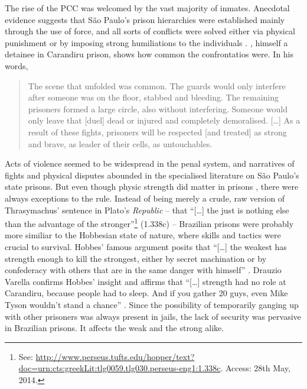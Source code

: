 The rise of the PCC was welcomed by the vast majority of inmates. Anecdotal evidence suggests that S\~{a}o Paulo's prison hierarchies were established mainly through the use of force, and all sorts of conflicts were solved either via physical punishment or by imposing strong humiliations to the individuals \citep[]{adorno1991sistema, ramalho1979mundo}. \citet[4]{negrini2002enjaulado}, himself a detainee in Carandiru prison, shows how common the confrontatios were. In his words,

\begin{quotation}
The scene that unfolded was common. The guards would only interfere after someone was on the floor, stabbed and bleeding. The remaining prisoners formed a large circle, also without interfering. Someone would only leave that [duel] dead or injured and completely demoralised. [\dots] As a result of these fights, prisoners will be respected [and treated] as strong and brave, as leader of their cells, as untouchables. 
\end{quotation}

Acts of violence seemed to be widespread in the penal system, and narratives of fights and physical disputes abounded in the specialised literature on S\~{a}o Paulo's state prisons. But even though physic strength did matter in prisons \citep[]{thompson1980questao, ramalho1979mundo}, there were always exceptions to the rule. Instead of being merely a crude, raw version of Thrasymachus' sentence in Plato's \textit{Republic} -- that ``[\dots] the just is nothing else than the advantage of the stronger''\footnote{See: \href{http://www.perseus.tufts.edu/hopper/text?doc=urn:cts:greekLit:tlg0059.tlg030.perseus-eng1:1.338c}{http://www.perseus.tufts.edu/hopper/text?doc=urn:cts:greekLit:tlg0059.tlg030.perseus-eng1:1.338c}. Access: 28th May, 2014.} (1.338c) -- Brazilian prisons were probably more similiar to the Hobbesian state of nature, where skills and tactics were crucial to survival. Hobbes' famous argument posits that ``[\dots] the weakest has strength enough to kill the strongest, either by secret machination or by confederacy with others that are in the same danger with himself'' \citep[61]{hobbes1985leviathan}. Drauzio Varella confirms Hobbes' insight and affirms that ``[\dots] strength had no role at Carandiru, because people had to sleep. And if you gather 20 guys, even Mike Tyson wouldn't stand a chance'' \citep[]{vanityfair2007pcc}. Since the possibility of temporarily ganging up with other prisoners was always present in jails, the lack of security was pervasive in Brazilian prisons. It affects the weak and the strong alike.

